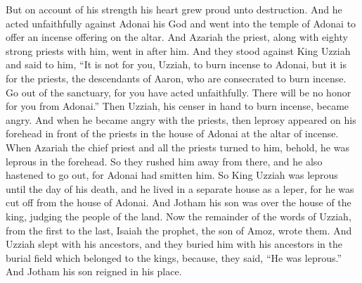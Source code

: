 \begin{biblechapter}
\verse But on account of his strength his heart grew proud unto destruction. And he acted unfaithfully against Adonai his God and went into the temple of Adonai to offer an incense offering on the altar.
\verse And Azariah the priest, along with eighty strong priests with him, went in after him.
\verse And they stood against King Uzziah and said to him, “It is not for you, Uzziah, to burn incense to Adonai, but it is for the priests, the descendants of Aaron, who are consecrated to burn incense. Go out of the sanctuary, for you have acted unfaithfully. There will be no honor for you from Adonai.”
\verse Then Uzziah, his censer in hand to burn incense, became angry. And when he became angry with the priests, then leprosy appeared on his forehead in front of the priests in the house of Adonai at the altar of incense.
\verse When Azariah the chief priest and all the priests turned to him, behold, he was leprous in the forehead. So they rushed him away from there, and he also hastened to go out, for Adonai had smitten him.
\verse So King Uzziah was leprous until the day of his death, and he lived in a separate house as a leper, for he was cut off from the house of Adonai. And Jotham his son was over the house of the king, judging the people of the land.
\verse Now the remainder of the words of Uzziah, from the first to the last, Isaiah the prophet, the son of Amoz, wrote them.
\verse And Uzziah slept with his ancestors, and they buried him with his ancestors in the burial field which belonged to the kings, because, they said, “He was leprous.” And Jotham his son reigned in his place.
\end{biblechapter}

